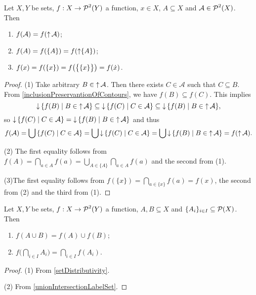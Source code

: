 \begin{lemma}
Let $X,Y$ be sets, $f: X\to \operatorname{\mathcal{P}}^2(Y)$ a function, $x\in X$, $A\subseteq X$ and $\mathcal{A}\in\operatorname{\mathcal{P}}^2(X)$. Then
\begin{enumerate}
\item $f(\mathcal{A}) = f(\operatorname{\uparrow}\mathcal{A})$;
\item $f(A) = f(\{A\}) = f(\operatorname{\uparrow}\{A\})$;
\item $f(x) = f(\{x\}) = f\big(\big\{\{x\}\big\}\big) = f(\dot{x})$.
\end{enumerate}
\end{lemma}
\begin{proof}
(1) Take arbitrary $B\in \operatorname{\uparrow} \mathcal{A}$. Then there exists $C\in \mathcal{A}$ such that $C\subseteq B$. From \ref{inclusionPreservantionOfContours}, we have $f(B) \subseteq f(C)$. This implies
\[ \downset \setbuilder{f(B)}{B\in \upset \mathcal{A}} \subseteq \downset \setbuilder{f(C)}{C\in \mathcal{A}} \subseteq \downset \setbuilder{f(B)}{B\in \upset \mathcal{A}}, \]
so $\downset \setbuilder{f(C)}{C\in \mathcal{A}} = \downset \setbuilder{f(B)}{B\in \upset \mathcal{A}}$ and thus
\[ f(\mathcal{A}) = \bigcup\setbuilder{f(C)}{C\in \mathcal{A}} = \bigcup\downset\setbuilder{f(C)}{C\in \mathcal{A}} = \bigcup\downset\setbuilder{f(B)}{B\in \upset\mathcal{A}} = f(\upset\mathcal{A}). \]

(2) The first equality follows from $f(A) = \bigcap_{a\in A} f(a) = \bigcup_{A\in\{A\}}\bigcap_{a\in A} f(a)$ and the second from (1).

(3)The first equality follows from $f(\{x\}) = \bigcap_{a\in \{x\}}f(a) = f(x)$, the second from (2) and the third from (1).
\end{proof}

\begin{lemma} \label{setContourUnionIntersection}
Let $X,Y$ be sets, $f: X\to \operatorname{\mathcal{P}}^2(Y)$ a function, $A,B \subseteq X$ and $\{A_i\}_{i\in I} \subseteq \operatorname{\mathcal{P}}(X)$. Then
\begin{enumerate}
\item $f(A \cup B) = f(A) \cup f(B)$;
\item $f\big(\bigcap_{i\in I}A_i\big) = \bigcap_{i\in I}f(A_i)$.
\end{enumerate}
\end{lemma}
\begin{proof}
(1) From \ref{setDistributivity}.

(2) From \ref{unionIntersectionLabelSet}.
\end{proof}

